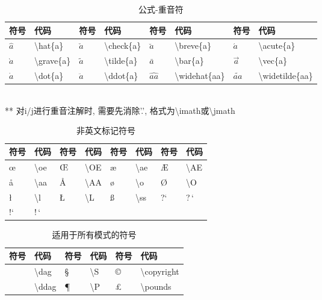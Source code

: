 \documentclass[UTF8,fontset=ubuntu]{ctexart}
\begin{document}
\begin{table}[H]
\begin{tabular}{l l l l l l l l}
	\hline
	符号 & 代码 & 符号 & 代码 & 符号 & 代码 & 符号 & 代码\\
	\hline
	$\hat{a}$ & \textbackslash hat\{a\} & $\check{a}$ & \textbackslash check\{a\} & $\breve{a}$ & \textbackslash breve\{a\} & $\acute{a}$ & \textbackslash acute\{a\}\\
	$\grave{a}$ & \textbackslash grave\{a\} & $\tilde{a}$ & \textbackslash tilde\{a\} & $\bar{a}$ & \textbackslash bar\{a\} & $\vec{a}$ & \textbackslash vec\{a\}\\
	$\dot{a}$ & \textbackslash dot\{a\} & $\ddot{a}$ & \textbackslash ddot\{a\} & $\widehat{aa}$ & \textbackslash widehat\{aa\} & $\widetilde{aa}$ & \textbackslash widetilde\{aa\}\\
	\hline
\end{tabular}\\[2mm]
** 对i/j进行重音注解时, 需要先消除'.', 格式为\textbackslash imath或\textbackslash jmath
\caption{公式-重音符}
\end{table}

\begin{table}[H]
\begin{tabular}{l l l l l l l l}
	\hline
	符号 & 代码 & 符号 & 代码 & 符号 & 代码 & 符号 & 代码\\
	\hline
	\oe & \textbackslash oe & \OE & \textbackslash OE & \ae & \textbackslash ae & \AE & \textbackslash AE\\
	\aa & \textbackslash aa & \AA & \textbackslash AA & \o & \textbackslash o & \O & \textbackslash O\\
	\l & \textbackslash l & \L & \textbackslash L & \ss & \textbackslash ss & ?` & ?\,`\\
	!` & !\,`\\
	\hline
\end{tabular}
\caption{非英文标记符号}
\end{table}

\begin{table}[H]
\begin{tabular}{l l l l l l}
	\hline
	符号 & 代码 & 符号 & 代码 & 符号 & 代码\\
	\hline
	\dag & \textbackslash dag & \S & \textbackslash S & \copyright & \textbackslash copyright\\
	\ddag & \textbackslash ddag & \P & \textbackslash P & \pounds & \textbackslash pounds\\
	\hline
\end{tabular}
\caption{适用于所有模式的符号}
\end{table}
\end{document}
